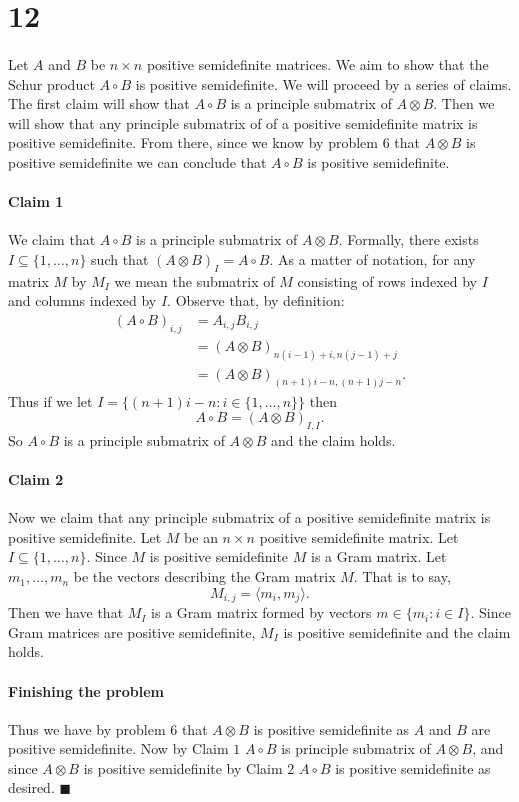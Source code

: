 \documentclass[letterpaper,12pt,oneside,onecolumn]{article}
\begin{document}
\section*{12}
\paragraph{}
Let $A$ and $B$ be $n \times n$ positive semidefinite matrices. We aim to show that the Schur product
$A \circ B$ is positive semidefinite. We will proceed by a series of claims. The first claim will show that $A\circ B$ is a principle submatrix of $A \otimes B$. Then we will show that any principle submatrix of of a positive semidefinite matrix is positive semidefinite. From there, since we know by problem $6$ that $A \otimes B$ is positive semidefinite we can conclude that $A \circ B$ is positive semidefinite.
\paragraph{Claim 1}
We claim that $A \circ B$ is a principle submatrix of $A \otimes B$. Formally, there exists $I \subseteq \{1, \dots, n\}$ such that $(A\otimes B)_I = A\circ B$. As a matter of notation, for any matrix $M$ by $M_I$ we mean the submatrix of $M$ consisting of rows indexed by $I$ and columns indexed by $I$. Observe that, by definition:
\begin{align*}
(A \circ B)_{i,j} &= A_{i,j}B_{i,j} \\
&= (A \otimes B)_{n(i-1) + i, n(j-1) + j} \\
&= (A \otimes B)_{(n+1)i -n, (n+1)j - n}.
\end{align*}
Thus if we let $I = \{(n+1)i - n: i \in \{1, \dots, n\}\}$ then $$A\circ B = (A\otimes B)_{I,I}.$$ So $A \circ B$ is a principle submatrix of $A\otimes B$ and the claim holds.
\paragraph{Claim 2}
Now we claim that any principle submatrix of a positive semidefinite matrix is positive semidefinite. Let $M$ be an $n \times n$ positive semidefinite matrix. Let $I \subseteq \{1,\dots, n\}$. Since $M$ is positive semidefinite $M$ is a Gram matrix. Let $m_1, \dots, m_n$ be the vectors describing the Gram matrix $M$. That is to say,
$$M_{i,j} = \langle m_i,m_j\rangle.$$
Then we have that $M_I$ is a Gram matrix formed by vectors $m \in \{m_i : i \in I\}$. Since Gram matrices are positive semidefinite, $M_I$ is positive semidefinite and the claim holds.
\paragraph{Finishing the problem}
Thus we have by problem $6$ that $A \otimes B$ is positive semidefinite as $A$ and $B$ are positive semidefinite. Now by Claim $1$ $A \circ B$ is principle submatrix of $A\otimes B$, and since $A \otimes B$ is positive semidefinite by Claim $2$ $A \circ B$ is positive semidefinite as desired. $\blacksquare$
\end{document}
